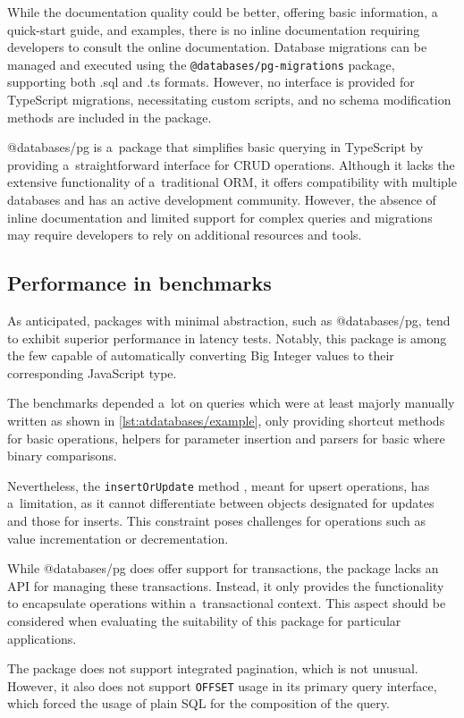 While the documentation quality could be better, offering basic information, a
quick-start guide, and examples, there is no inline documentation requiring
developers to consult the online documentation. Database migrations can be
managed and executed using the \texttt{@databases/pg-migrations} package,
supporting both .sql and .ts formats. However, no interface is provided for
TypeScript migrations, necessitating custom scripts, and no schema modification
methods are included in the package.

@databases/pg is a~package that simplifies basic querying in TypeScript
by providing a~straightforward interface for CRUD operations. Although it lacks
the extensive functionality of a~traditional ORM, it offers compatibility with
multiple databases and has an active development community. However, the absence
of inline documentation and limited support for complex queries and migrations
may require developers to rely on additional resources and tools.

\subsection*{Performance in benchmarks}
As anticipated, packages with minimal abstraction, such as @databases/pg, tend
to exhibit superior performance in latency tests. Notably, this package is among
the few capable of automatically converting Big Integer values to their
corresponding JavaScript type.

The benchmarks depended a~lot on queries which were at least majorly manually
written as shown in \autoref{lst:atdatabases/example}, only providing shortcut
methods for basic operations, helpers for parameter insertion and parsers for
basic where binary comparisons.

Nevertheless, the \texttt{insertOrUpdate} method \cite{databases/pg}, meant for
upsert operations, has a~limitation, as it cannot differentiate between objects
designated for updates and those for inserts. This constraint poses challenges
for operations such as value incrementation or decrementation.

While @databases/pg does offer support for transactions, the package lacks an
API for managing these transactions. Instead, it only provides the functionality
to encapsulate operations within a~transactional context. This aspect should be
considered when evaluating the suitability of this package for particular
applications.

The package does not support integrated pagination, which is not unusual.
However, it also does not support \texttt{OFFSET} usage in its primary query
interface, which forced the usage of plain SQL for the composition of the query.
